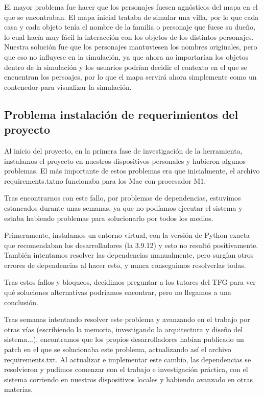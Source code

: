 El mayor problema fue hacer que los personajes fuesen agnósticos del mapa en el que se encontraban. El mapa inicial trataba de simular una villa, por lo que cada casa y cada objeto tenía el nombre de la familia o personaje que fuese su dueño, lo cual hacía muy fácil la interacción con los objetos de los distintos personajes. Nuestra solución fue que los personajes mantuviesen los nombres originales, pero que eso no influyese en la simulación, ya que ahora no importarían los objetos dentro de la simulación y los usuarios podrían decidir el contexto en el que se encuentran los persoajes, por lo que el mapa servirá ahora simplemente como un contenedor para visualizar la simulación.

\subsection{Problema instalación de requerimientos del proyecto}

Al inicio del proyecto, en la primera fase de investigación de la herramienta, instalamos el proyecto en nuestros dispositivos personales y hubieron algunos problemas. El más importante de estos problemas era que inicialmente, el archivo \textquotesingle requirements.txt\textquotesingle no funcionaba para los Mac con procesador M1.

Tras encontrarnos con este fallo, por problemas de dependencias, estuvimos estancados durante unas semanas, ya que no podíamos ejecutar el sistema y estaba habiendo problemas para solucionarlo por todos los medios.

Primeramente, instalamos un entorno virtual, con la versión de Python exacta que recomendaban los desarrolladores (la 3.9.12) y esto no resultó positivamente. También intentamos resolver las dependencias manualmente, pero surgían otros errores de dependencias al hacer esto, y nunca conseguimos resolverlas todas.

Tras estos fallos y bloqueos, decidimos preguntar a los tutores del TFG para ver qué soluciones alternativas podríamos encontrar, pero no llegamos a una conclusión. 

Tras semanas intentando resolver este problema y avanzando en el trabajo por otras vías (escribiendo la memoria, investigando la arquitectura y diseño del sistema...), encontramos que los propios desarrolladores habían publicado un patch en el que se solucionaba este problema, actualizando así el archivo requirements.txt. Al actualizar e implementar este cambio, las dependencias se resolvieron y pudimos comenzar con el trabajo e investigación práctica, con el sistema corriendo en nuestros dispositivos locales y habiendo avanzado en otras materias.

